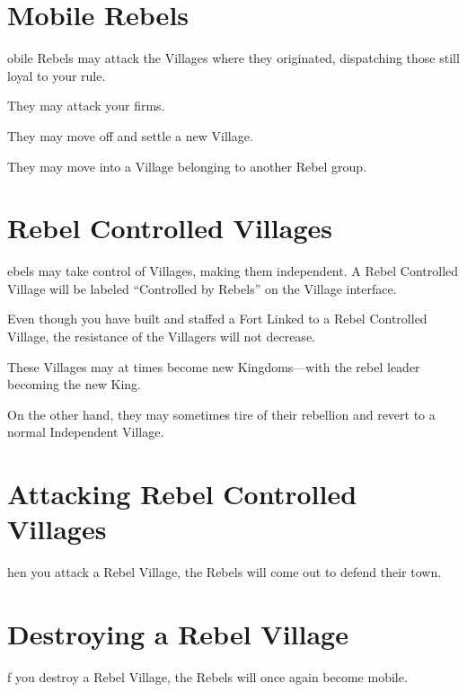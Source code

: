 \section{Mobile Rebels}


obile Rebels may attack the Villages where they originated, dispatching those still loyal to your rule.

They may attack your firms.

They may move off and settle a new Village.

They may move into a Village belonging to another Rebel group.

\section{Rebel Controlled Villages}


ebels may take control of Villages, making them independent. A Rebel Controlled Village will be labeled “Controlled by Rebels” on the Village interface.

Even though you have built and staffed a Fort Linked to a Rebel Controlled Village, the resistance of the Villagers will not decrease.

These Villages may at times become new Kingdoms---with the rebel leader becoming the new King.

On the other hand, they may sometimes tire of their rebellion and revert to a normal Independent Village.

\section{Attacking Rebel Controlled Villages}


hen you attack a Rebel Village, the Rebels will come out to defend their town.

\section{Destroying a Rebel Village}


f you destroy a Rebel Village, the Rebels will once again become mobile.